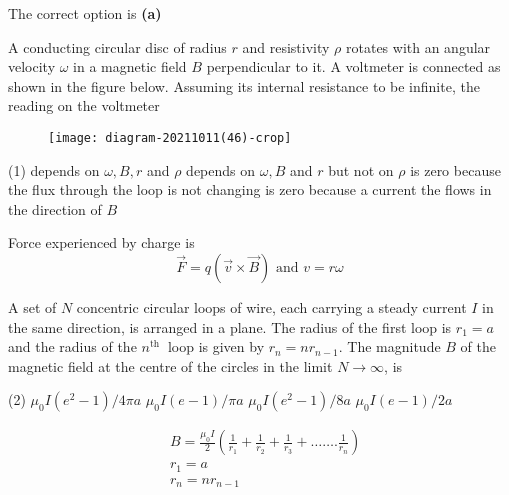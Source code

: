 \begin{enumerate}
\begin{answer}
	The correct option is \textbf{(a)}
\end{answer}
\begin{minipage}{\textwidth}
	\item A conducting circular disc of radius $r$ and resistivity $\rho$ rotates with an angular velocity $\omega$ in a magnetic field $B$ perpendicular to it. A voltmeter is connected as shown in the figure below. Assuming its internal resistance to be infinite, the reading on the voltmeter
	\begin{figure}[H]
		\centering
		\texttt{[image: diagram-20211011(46)-crop]}
	\end{figure}
\end{minipage}
\begin{tasks}(1)
	\task[\textbf{A.}] depends on $\omega, B, r$ and $\rho$
	\task[\textbf{B.}]depends on $\omega, B$ and $r$ but not on $\rho$
	\task[\textbf{C.}]is zero because the flux through the loop is not changing
	\task[\textbf{D.}]is zero because a current the flows in the direction of $B$
\end{tasks}
\begin{answer}
	Force experienced by charge is
	$$
	\vec{F}=q(\vec{v} \times \vec{B}) \text { and } v=r \omega
	$$	
\end{answer}
\begin{minipage}{\textwidth}
	\item A set of $N$ concentric circular loops of wire, each carrying a steady current $I$ in the same direction, is arranged in a plane. The radius of the first loop is $r_{1}=a$ and the radius of the $n^{\text {th }}$ loop is given by $r_{n}=n r_{n-1}$. The magnitude $B$ of the magnetic field at the centre of the circles in the limit $N \rightarrow \infty$, is
\end{minipage}
\begin{tasks}(2)
	\task[\textbf{A.}] $\mu_{0} I\left(e^{2}-1\right) / 4 \pi a$
	\task[\textbf{B.}]$\mu_{0} I(e-1) / \pi a$
	\task[\textbf{C.}]$\mu_{0} I\left(e^{2}-1\right) / 8 a$
	\task[\textbf{D.}]$\mu_{0} I(e-1) / 2 a$
\end{tasks}
\begin{answer}
	\begin{align*}
	&B=\frac{\mu_{0} I}{2}\left(\frac{1}{r_{1}}+\frac{1}{r_{2}}+\frac{1}{r_{3}}+\ldots \ldots . \frac{1}{r_{n}}\right)\\
	&r_{1}=a \\
	&r_{n}=n r_{n-1} \\

\end{align*}
\end{answer}
\end{enumerate}
